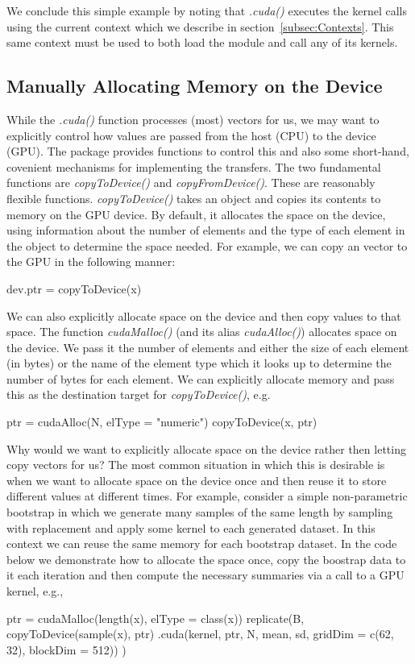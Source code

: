 \documentclass[article]{jss}
\def\R{\proglang{R}}
\def\Rpkg#1{\pkg{#1}}
\def\Rfunc#1{\textsl{#1()}}
\begin{document}
We conclude this simple example by noting that \Rfunc{.cuda} executes the kernel calls using
the current context which we describe in section~\ref{subsec:Contexts}. 
This same context must be used to both load the module and call any of its kernels.

\subsection{Manually Allocating Memory on the Device}\label{subsec:memory}
While the \Rfunc{.cuda} function processes (most) \R{} vectors for us,
we may want to explicitly control how values are passed from the
host (CPU) to the device (GPU). The \Rpkg{RCUDA} package provides
functions to control this and also some short-hand, covenient
mechanisms for implementing the transfers.  The two fundamental
functions are \Rfunc{copyToDevice} and \Rfunc{copyFromDevice}.  These
are reasonably flexible functions.  \Rfunc{copyToDevice} takes an \R{}
object and copies its contents to memory on the GPU device.  By
default, it allocates the space on the device, using information about
the number of elements and the type of each element in the \R{} object
to determine the space needed.  For example, we can copy an \R{}
vector to the GPU in the following manner:
\begin{RCode}
dev.ptr = copyToDevice(x)
\end{RCode}

We can also explicitly allocate space on the device and then copy
values to that space.  The function \Rfunc{cudaMalloc} (and its alias
\Rfunc{cudaAlloc}) allocates space on the device.  We pass it the
number of elements and either the size of each element (in bytes) or
the name of the element type which it looks up to determine the number
of bytes for each element.  We can explicitly allocate memory and pass
this as the destination target for \Rfunc{copyToDevice}, e.g.
\begin{RCode}
ptr = cudaAlloc(N, elType = "numeric")
copyToDevice(x, ptr)
\end{RCode}


Why would we want to explicitly allocate space on the device rather
then letting \R{} copy vectors for us?  The most common situation in
which this is desirable is when we want to allocate space on the 
device once and then reuse it to store different values at different
times. For example, consider a simple non-parametric bootstrap in which we
generate many samples of the same length by sampling with replacement
and apply some kernel to each generated dataset. In this context we can
reuse the same memory for each bootstrap dataset. In the code below we 
demonstrate how to allocate the space once, copy the boostrap data to it
each iteration and then compute the necessary summaries via a call
to a GPU kernel, e.g.,
\begin{RCode}
ptr = cudaMalloc(length(x), elType = class(x))
replicate(B, {
      copyToDevice(sample(x), ptr)
      .cuda(kernel, ptr, N, mean, sd, gridDim = c(62, 32), blockDim = 512))
})
\end{RCode}
\end{document}

